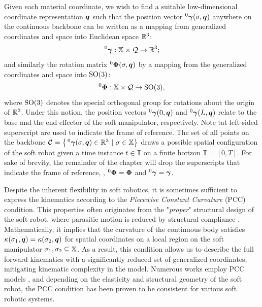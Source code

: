 Given each material coordinate, we wish to find a suitable low-dimensional  coordinate representation ${\boldsymbol{q}}$ such that the position vector $^0{\boldsymbol{\gamma}}(\sigma,{\boldsymbol{q}})$ anywhere on the continuous backbone can be written as a mapping from generalized coordinates and space into Euclidean space $\mathbb{R}^3$:
%
\begin{equation}
^0{\boldsymbol{\gamma}}: \mathbb{X} \times \mathcal{Q} \to \mathbb{R}^3;
\end{equation}
%
and similarly the rotation matrix $^0\boldsymbol{\Phi}(\sigma,\boldsymbol{q})$ by a mapping from the generalized coordinates and space into $\textup{\textrm{SO}}(3)$:
%
\begin{equation}
^0{\boldsymbol{\Phi}}: \mathbb{X} \times \mathcal{Q} \to \textup{\textrm{SO}}(3), \label{eq:phi_map}
\end{equation}
%
where {$\textup{\textrm{SO}}(3)$ denotes the special orthogonal group for rotations about the origin of $\mathbb{R}^3$}. Under this notion, the position vectors $^0{\boldsymbol{\gamma}}(0,{\boldsymbol{q}})$ and $^0{\boldsymbol{\gamma}}(L,{\boldsymbol{q}})$ relate to the base and the end-effector of the soft  manipulator, respectively. {Note tat left-sided superscript are used to indicate the frame of reference.} The set of all points on the backbone $\boldsymbol{\mathcal{C}} = \left\{\,^0{\boldsymbol{\gamma}}(\sigma,{\boldsymbol{q}}) \in \mathbb{R}^3~|~\sigma \in \mathbb{X} \right\}$ draws a possible {spatial} configuration of the soft robot given {a time instance $t \in \mathbb{T}$ on a finite horizon $\mathbb{T} = [0,T]$}.  For sake of brevity, the remainder of the chapter will drop the superscripts that indicate the frame of reference, \ie, $^0{\boldsymbol{\Phi}} = {\boldsymbol{\Phi}}$ and $^0{\boldsymbol{\gamma}} = {\boldsymbol{\gamma}}$.
%
\begin{asm}
\label{asm:C2:pcc}
Despite the inherent flexibility in soft robotics, it is sometimes sufficient to express the kinematics according to the \emph{Piecewise Constant Curvature} (PCC) condition.  This properties often originates from the "\textit{proper}" structural design of the soft robot, where parasitic motion is reduced by structural compliance . Mathematically, it implies that the curvature of the continuous body satisfies $\kappa(\sigma_1,{\boldsymbol{q}}) = \kappa(\sigma_2,{\boldsymbol{q}})$ for spatial coordinates on a local region on the soft manipulator $\sigma_1,\sigma_2 \subseteq \mathbb{X}$. As a result, this condition allows us to describe the full forward kinematics with a significantly reduced set of generalized coordinates, mitigating kinematic complexity in the model. Numerous works employ PCC models \cite{Falkenhahn2015,Katzschmann2019,Tatlicioglu2007,Marchese2016,Godage2016,DellaSantina2020a}, and depending on the elasticity  and structural geometry of the soft robot, the PCC condition has been proven to be consistent for various soft robotic systems.
\end{asm}
